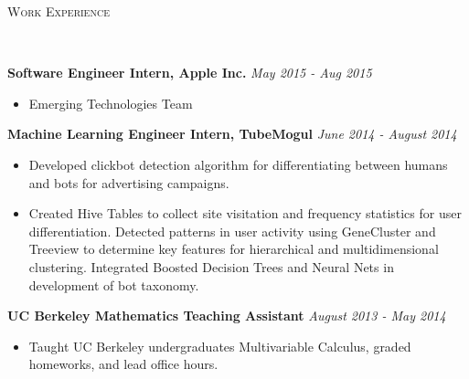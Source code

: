 \documentclass[9pt]{extarticle}
\newenvironment{changemargin}[2]{%
  \begin{list}{}{%
    \setlength{\topsep}{0pt}%
    \setlength{\leftmargin}{#1}%
    \setlength{\rightmargin}{#2}%
    \setlength{\listparindent}{\parindent}%
    \setlength{\itemindent}{\parindent}%
    \setlength{\parsep}{\parskip}%
  }%
  \item[]}{\end{list}
}
\newcommand{\lineover}{
	\begin{changemargin}{-0.05in}{-0.05in}
		\vspace*{-8pt}
		\hrulefill \\
		\vspace*{-2pt}
	\end{changemargin}
}
\newcommand{\header}[1]{
    \vspace{5pt}
	\begin{changemargin}{-0.5in}{-0.5in}
		\scshape{#1}\\
  	\lineover
	\end{changemargin}
	\vspace{5pt}
}
\newenvironment{body} {
	\vspace*{-9pt}
	\begin{changemargin}{-0.5in}{-0.5in}
  }	
	{\end{changemargin}
}
\begin{document}
\vspace*{-2pt}
\header{Work Experience}
\begin{body}
	\vspace{1pt}
	\textbf{Software Engineer Intern, Apple Inc.} \hfill \emph{May 2015 - Aug 2015}\\
	\vspace*{-4pt}
	\begin{itemize}
		\itemsep -0pt
		\item[] Emerging Technologies Team
	\end{itemize}

    
    \textbf{Machine Learning Engineer Intern, TubeMogul} 
     \hfill \emph{June 2014 - August 2014}\\
	\vspace*{-4pt}
	\begin{itemize} \itemsep -0pt  %
		\item[] Developed clickbot detection algorithm for differentiating between humans and bots for advertising campaigns. 
		\item[] Created Hive Tables to collect site visitation and frequency statistics for user differentiation. Detected patterns in user activity using GeneCluster and Treeview to determine key features for hierarchical and multidimensional clustering. Integrated Boosted Decision Trees and Neural Nets in development of bot taxonomy. 
	\end{itemize}
    	
	\textbf{UC Berkeley Mathematics Teaching Assistant} 
	 \hfill \emph{August 2013 - May 2014}\\
	\vspace*{-4pt}
	\begin{itemize} \itemsep -0pt  %
		\item[] Taught UC Berkeley undergraduates Multivariable Calculus, graded homeworks, and lead office hours.
	\end{itemize}	
\end{body}
\end{document}
